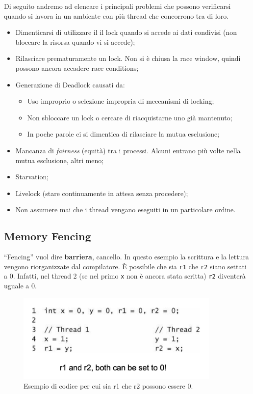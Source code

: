 Di seguito andremo ad elencare i principali problemi che possono verificarsi quando si lavora
in un ambiente con più thread che concorrono tra di loro.

\begin{itemize}
    \item Dimenticarsi di utilizzare il il lock quando si accede ai dati condivisi
          (non bloccare la risorsa quando vi si accede);
    \item Rilasciare prematuramente un lock. Non si è chiusa la race window, quindi
          possono ancora accadere race conditions;
    \item Generazione di Deadlock causati da:
          \begin{itemize}
              \item Uso improprio o selezione impropria di meccanismi di locking;
              \item Non sbloccare un lock o cercare di riacquistarne uno già mantenuto;
              \item In poche parole ci si dimentica di rilasciare la mutua esclusione;
          \end{itemize}
    \item Mancanza di \textit{fairness} (equità) tra i processi.
          Alcuni entrano più volte nella mutua esclusione, altri meno;
    \item Starvation;
    \item Livelock (stare continuamente in attesa senza procedere);
    \item Non assumere mai che i thread vengano eseguiti in un particolare ordine.
\end{itemize}

\subsection{Memory Fencing}

“Fencing” vuol dire \textbf{barriera}, cancello.
In questo esempio la scrittura e la lettura vengono riorganizzate dal compilatore.
È possibile che sia \verb|r1| che \verb|r2| siano settati a 0.
Infatti, nel thread 2 (se nel primo \verb|x| non è ancora stata scritta) \verb|r2|
diventerà uguale a 0.

\begin{figure}[H]
    \centering
    \includegraphics[width=10cm, keepaspectratio]{capitoli/secure_coding/img/cap_6/nofance.png}
    \caption{Esempio di codice per cui sia r1 che r2 possono essere 0.}
\end{figure}

